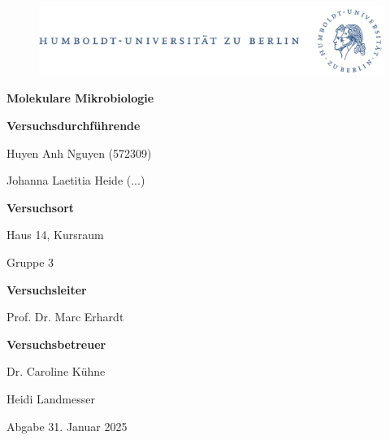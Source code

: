 \documentclass[oneside,10pt,a4paper]{report}
\begin{document}
	
	\begin{titlepage}
		\begin{center}
			\begin{figure}[h!tbp]
				\includegraphics[width=\linewidth]{HUlogo.PNG}
			\end{figure}
			\vspace*{2 cm}
			
			\textcolor{Bluetitle}{\textbf{\huge Molekulare Mikrobiologie}}\par
			
			\vspace*{2cm}
			\textcolor{Greyish}{\textbf{Versuchsdurchführende}}\par
			\textcolor{Greyish}{Huyen Anh Nguyen (572309)}\par
			\textcolor{Greyish}{Johanna Laetitia Heide (...)}\par
			
			
			\vspace*{0.5cm}
			\textcolor{Greyish}{\textbf{Versuchsort}}\par
			\textcolor{Greyish}{Haus 14, Kursraum}\par
			\textcolor{Greyish}{Gruppe 3}\par
			
			
			\vspace*{2 cm}
			\textcolor{Greyish}{\textbf{Versuchsleiter}}\par
			\textcolor{Greyish}{Prof. Dr. Marc Erhardt}\par
			\vspace*{0.5cm}
			\textcolor{Greyish}{\textbf{Versuchsbetreuer}}\par
			\textcolor{Greyish}{Dr. Caroline Kühne}\par
			\textcolor{Greyish}{Heidi Landmesser}\par

			
			\vspace*{2 cm}
			\textcolor{Greyish}{Abgabe 31. Januar 2025}\par
			
			
			
		\end{center}
	\end{titlepage}
	
\end{document}
